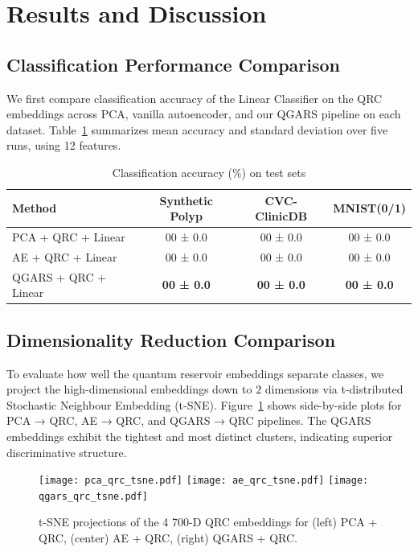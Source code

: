 \documentclass[conference]{IEEEtran}
\begin{document}
\section{Results and Discussion}

\subsection{Classification Performance Comparison}
We first compare classification accuracy of the Linear Classifier on the QRC embeddings across PCA,
vanilla autoencoder, and our QGARS pipeline on each dataset. 
Table~\ref{tab:qrc_reduction_accuracy} summarizes mean accuracy and standard deviation over 
five runs, using 12 features.

\begin{table}[!htb]
  \caption{Classification accuracy (\%) on test sets}
  \label{tab:qrc_reduction_accuracy}
  \centering
  \begin{tabular}{lccc}
    \hline
    Method & Synthetic Polyp & CVC-ClinicDB & MNIST(0/1) \\
    \hline
    PCA + QRC + Linear      &  00 ± 0.0  &  00 ± 0.0  &  00 ± 0.0 \\
    AE + QRC + Linear       &  00 ± 0.0  &  00 ± 0.0  &  00 ± 0.0 \\
    QGARS + QRC + Linear    &  \textbf{00 ± 0.0} &  \textbf{00 ± 0.0} &  \textbf{00 ± 0.0} \\
    \hline
  \end{tabular}
\end{table}


\subsection{Dimensionality Reduction Comparison}

To evaluate how well the quantum reservoir embeddings separate classes, we project the high-dimensional embeddings down to $2$ dimensions via t-distributed Stochastic Neighbour Embedding (t-SNE). Figure~\ref{fig:embeddings_tsne} shows side-by-side plots for PCA → QRC, AE → QRC, and QGARS → QRC pipelines. The QGARS embeddings exhibit the tightest and most distinct clusters, indicating superior discriminative structure.

\begin{figure}[ht]
  \centering
  \texttt{[image: pca\_qrc\_tsne.pdf]}
  \texttt{[image: ae\_qrc\_tsne.pdf]}
  \texttt{[image: qgars\_qrc\_tsne.pdf]}
  \caption{t-SNE projections of the 4 700-D QRC embeddings for (left) PCA + QRC, (center) AE + QRC, (right) QGARS + QRC.}
  \label{fig:embeddings_tsne}
\end{figure}
\end{document}
